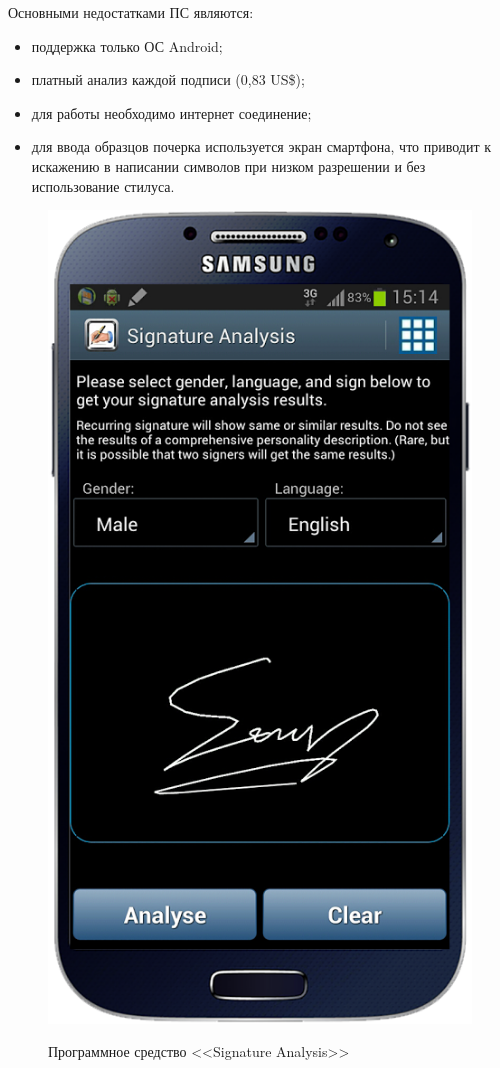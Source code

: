 Основными недостатками ПС являются:
\begin{itemize}
  \item поддержка только ОС Android;
  \item платный анализ каждой подписи (0,83 US\$);
  \item для работы необходимо интернет соединение;
  \item для ввода образцов почерка используется экран смартфона, что приводит к искажению в написании символов при низком разрешении и без использование стилуса.
\end{itemize}

\begin{figure}[ht]{}
    \centering
    \label{fig:domain:analogs:signature_analysis}
    \includegraphics[height=0.4\textheight]{figures/analog_signature_analysis.png}
    \caption{Программное средство <<Signature Analysis>>}
\end{figure}


